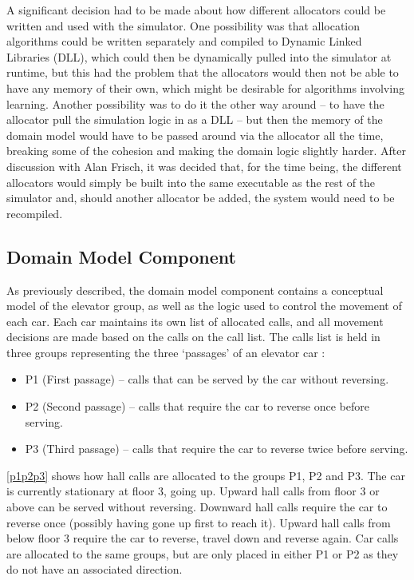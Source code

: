 \documentclass{UoYCSproject}
\begin{document}
A significant decision had to be made about how different allocators could be written and used with the simulator.  One possibility was that allocation algorithms could be written separately and compiled to Dynamic Linked Libraries (DLL), which could then be dynamically pulled into the simulator at runtime, but this had the problem that the allocators would then not be able to have any memory of their own, which might be desirable for algorithms involving learning.  Another possibility was to do it the other way around -- to have the allocator pull the simulation logic in as a DLL -- but then the memory of the domain model would have to be passed around via the allocator all the time, breaking some of the cohesion and making the domain logic slightly harder.  After discussion with Alan Frisch, it was decided that, for the time being, the different allocators would simply be built into the same executable as the rest of the simulator and, should another allocator be added, the system would need to be recompiled.

\subsection{Domain Model Component}

As previously described, the domain model component contains a conceptual model of the elevator group, as well as the logic used to control the movement of each car.  Each car maintains its own list of allocated calls, and all movement decisions are made based on the calls on the call list.  The calls list is held in three groups representing the three `passages' of an elevator car \citep{Gagov2001,Rong2003}:
\begin{itemize}
	\item P1 (First passage) -- calls that can be served by the car without reversing.
	\item P2 (Second passage) -- calls that require the car to reverse once before serving.
	\item P3 (Third passage) -- calls that require the car to reverse twice before serving.
\end{itemize}

\autoref{p1p2p3} shows how hall calls are allocated to the groups P1, P2 and P3.  The car is currently stationary at floor 3, going up.  Upward hall calls from floor 3 or above can be served without reversing.  Downward hall calls require the car to reverse once (possibly having gone up first to reach it).  Upward hall calls from below floor 3 require the car to reverse, travel down and reverse again.  Car calls are allocated to the same groups, but are only placed in either P1 or P2 as they do not have an associated direction.
\end{document}
